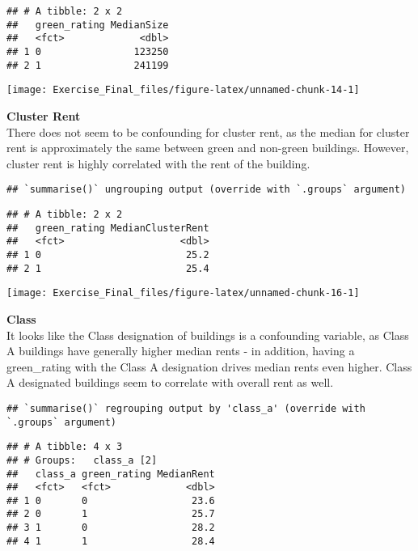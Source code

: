 \documentclass[
]{article}
\begin{document}
\begin{verbatim}
## # A tibble: 2 x 2
##   green_rating MedianSize
##   <fct>             <dbl>
## 1 0                123250
## 2 1                241199
\end{verbatim}

\begin{center}\texttt{[image: Exercise\_Final\_files/figure-latex/unnamed-chunk-14-1]} \end{center}

\textbf{Cluster Rent}\\
There does not seem to be confounding for cluster rent, as the median
for cluster rent is approximately the same between green and non-green
buildings. However, cluster rent is highly correlated with the rent of
the building.

\begin{verbatim}
## `summarise()` ungrouping output (override with `.groups` argument)
\end{verbatim}

\begin{verbatim}
## # A tibble: 2 x 2
##   green_rating MedianClusterRent
##   <fct>                    <dbl>
## 1 0                         25.2
## 2 1                         25.4
\end{verbatim}

\begin{center}\texttt{[image: Exercise\_Final\_files/figure-latex/unnamed-chunk-16-1]} \end{center}

\textbf{Class}\\
It looks like the Class designation of buildings is a confounding
variable, as Class A buildings have generally higher median rents - in
addition, having a green\_rating with the Class A designation drives
median rents even higher. Class A designated buildings seem to correlate
with overall rent as well.

\begin{verbatim}
## `summarise()` regrouping output by 'class_a' (override with `.groups` argument)
\end{verbatim}

\begin{verbatim}
## # A tibble: 4 x 3
## # Groups:   class_a [2]
##   class_a green_rating MedianRent
##   <fct>   <fct>             <dbl>
## 1 0       0                  23.6
## 2 0       1                  25.7
## 3 1       0                  28.2
## 4 1       1                  28.4
\end{verbatim}
\end{document}
